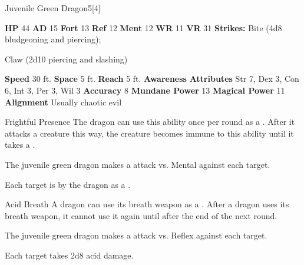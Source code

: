   \begin{monsubsection}{Juvenile Green Dragon}{5}[4]
    \vspace{-1em}\vspace{-1em}
    \vspace{0em}

    
    

    \begin{spellcontent}
      \begin{spelltargetinginfo}
        \pari \textbf{HP} 44 \monsep
          \textbf{AD} 15 \monsep
          \textbf{Fort} 13 \monsep
          \textbf{Ref} 12 \monsep
          \textbf{Ment} 12
        \pari \textbf{WR} 11 \monsep
        \textbf{VR} 31
        \pari \textbf{Strikes:}
            Bite  (4d8 bludgeoning and piercing);
\par Claw  (2d10 piercing and slashing)
      \end{spelltargetinginfo}
    \end{spellcontent}
    \begin{monsterfooter}
      \pari \textbf{Speed} 30 ft. \monsep
        \textbf{Space} 5 ft. \monsep
        \textbf{Reach} 5 ft.
      \pari \textbf{Awareness} 
      \pari \textbf{Attributes}
        Str 7, Dex 3,
        Con 6, Int 3,
        Per 3, Wil 3
      \pari \textbf{Accuracy} 8 \monsep
        \textbf{Mundane Power} 13 \monsep
      \textbf{Magical Power} 11
      \pari \textbf{Alignment} Usually chaotic evil
    \end{monsterfooter}
  \end{monsubsection}
  \begin{freeability}{Frightful Presence}
      The dragon can use this ability once per round as a .
      After it attacks a creature this way, the creature becomes immune to this ability until it takes a .
      \par The juvenile green dragon makes a  attack
        vs. Mental against each target.
    
    \hit Each target is  by the dragon as a .
    \end{freeability}
  

    \begin{freeability}{Acid Breath}
      A dragon can use its breath weapon as a .
      After a dragon uses its breath weapon, it cannot use it again until after the end of the next round.
      \par The juvenile green dragon makes a  attack
        vs. Reflex against each target.
    
    \hit Each target takes 2d8 acid damage.
    \end{freeability}
  
